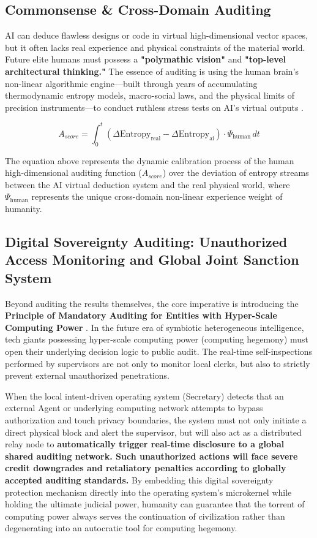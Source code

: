 \documentclass[11pt,a4paper]{article}
\begin{document}
\subsection{Commonsense \& Cross-Domain Auditing}

AI can deduce flawless designs or code in virtual high-dimensional vector spaces, but it often lacks real experience and physical constraints of the material world. Future elite humans must possess a \textbf{"polymathic vision"} and \textbf{"top-level architectural thinking."} The essence of auditing is using the human brain's non-linear algorithmic engine---built through years of accumulating thermodynamic entropy models, macro-social laws, and the physical limits of precision instruments---to conduct ruthless stress tests on AI's virtual outputs \cite{friston2010}.

\begin{equation}
A_{score} = \int_{0}^{t} \left( \Delta \text{Entropy}_{\text{real}} - \Delta \text{Entropy}_{\text{ai}} \right) \cdot \Psi_{\text{human}} \, dt
\end{equation}

The equation above represents the dynamic calibration process of the human high-dimensional auditing function ($A_{score}$) over the deviation of entropy streams between the AI virtual deduction system and the real physical world, where $\Psi_{\text{human}}$ represents the unique cross-domain non-linear experience weight of humanity.

\subsection{Digital Sovereignty Auditing: Unauthorized Access Monitoring and Global Joint Sanction System}

Beyond auditing the results themselves, the core imperative is introducing the \textbf{Principle of Mandatory Auditing for Entities with Hyper-Scale Computing Power} \cite{floridi2020}. In the future era of symbiotic heterogeneous intelligence, tech giants possessing hyper-scale computing power (computing hegemony) must open their underlying decision logic to public audit. The real-time self-inspections performed by supervisors are not only to monitor local clerks, but also to strictly prevent external unauthorized penetrations.

When the local intent-driven operating system (Secretary) detects that an external Agent or underlying computing network attempts to bypass authorization and touch privacy boundaries, the system must not only initiate a direct physical block and alert the supervisor, but will also act as a distributed relay node to \textbf{automatically trigger real-time disclosure to a global shared auditing network. Such unauthorized actions will face severe credit downgrades and retaliatory penalties according to globally accepted auditing standards.} By embedding this digital sovereignty protection mechanism directly into the operating system's microkernel while holding the ultimate judicial power, humanity can guarantee that the torrent of computing power always serves the continuation of civilization rather than degenerating into an autocratic tool for computing hegemony.
\end{document}
